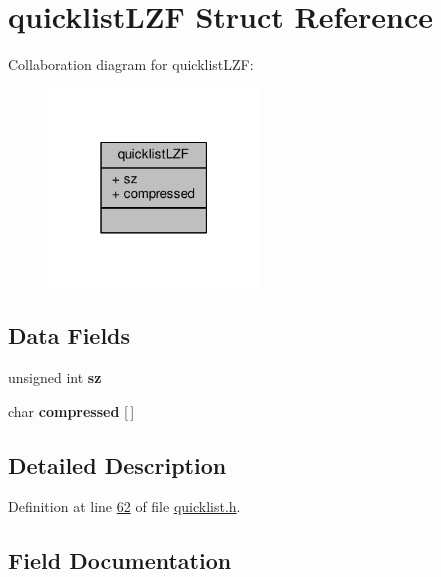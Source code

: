 \hypertarget{structquicklistLZF}{}\section{quicklist\+L\+ZF Struct Reference}
\label{structquicklistLZF}


Collaboration diagram for quicklist\+L\+ZF\+:\nopagebreak
\begin{figure}[H]
\begin{center}
\leavevmode
\includegraphics[width=159pt]{structquicklistLZF__coll__graph}
\end{center}
\end{figure}
\subsection*{Data Fields}
\begin{DoxyCompactItemize}
\item 
\mbox{\label{structquicklistLZF_a5c9d6d2c3740bd02019484d4978245f5}} 
unsigned int {\bfseries sz}
\item 
\mbox{\label{structquicklistLZF_aa656b86be0e51cb76d8f6a0892863fa3}} 
char {\bfseries compressed} \mbox{[}$\,$\mbox{]}
\end{DoxyCompactItemize}


\subsection{Detailed Description}


Definition at line \hyperlink{quicklist_8h_source_l00062}{62} of file \hyperlink{quicklist_8h_source}{quicklist.\+h}.



\subsection{Field Documentation}
\mbox{\label{structquicklistLZF_aa656b86be0e51cb76d8f6a0892863fa3}} 
